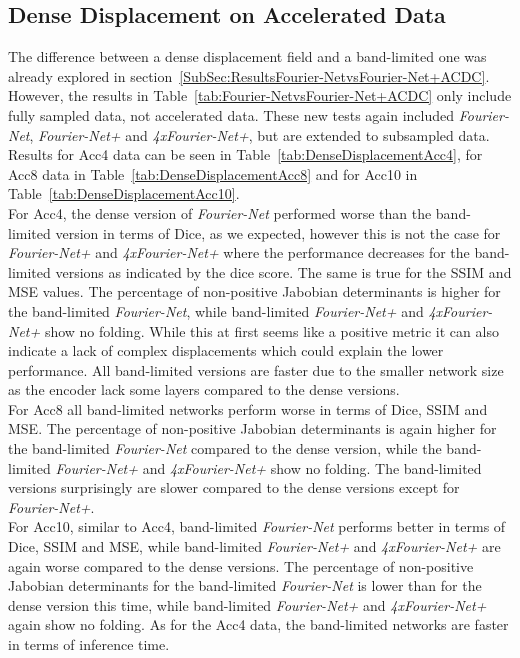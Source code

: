 \documentclass[english,version-2022-01]{uzl-thesis} %
\begin{document}
\subsection{Dense Displacement on Accelerated Data} \label{SubSec:DenseDisplacementAcc}
The difference between a dense displacement field and a band-limited one was already explored in section~\ref{SubSec:ResultsFourier-NetvsFourier-Net+ACDC}. However, the results in Table~\ref{tab:Fourier-NetvsFourier-Net+ACDC} only include fully sampled data, not accelerated data. These new tests again included \emph{Fourier-Net}, \emph{Fourier-Net+} and \emph{4xFourier-Net+}, but are extended to subsampled data. Results for Acc4 data can be seen in Table~\ref{tab:DenseDisplacementAcc4}, for Acc8 data in Table~\ref{tab:DenseDisplacementAcc8} and for Acc10 in Table~\ref{tab:DenseDisplacementAcc10}. \\
For Acc4, the dense version of \emph{Fourier-Net} performed worse than the band-limited version in terms of Dice, as we expected, however this is not the case for \emph{Fourier-Net+} and \emph{4xFourier-Net+} where the performance decreases for the band-limited versions as indicated by the dice score. The same is true for the SSIM and MSE values. The percentage of non-positive Jabobian determinants is higher for the band-limited \emph{Fourier-Net}, while band-limited \emph{Fourier-Net+} and \emph{4xFourier-Net+} show no folding. While this at first seems like a positive metric it can also indicate a lack of complex displacements which could explain the lower performance. All band-limited versions are faster due to the smaller network size as the encoder lack some layers compared to the dense versions.\\
For Acc8 all band-limited networks perform worse in terms of Dice, SSIM and MSE. The percentage of non-positive Jabobian determinants is again higher for the band-limited \emph{Fourier-Net} compared to the dense version, while the band-limited \emph{Fourier-Net+} and \emph{4xFourier-Net+} show no folding. The band-limited versions surprisingly are slower compared to the dense versions except for \emph{Fourier-Net+}. \\
For Acc10, similar to Acc4, band-limited \emph{Fourier-Net} performs better in terms of Dice, SSIM and MSE, while band-limited \emph{Fourier-Net+} and \emph{4xFourier-Net+} are again worse compared to the dense versions. The percentage of non-positive Jabobian determinants for the band-limited \emph{Fourier-Net} is lower than for the dense version this time, while band-limited \emph{Fourier-Net+} and \emph{4xFourier-Net+} again show no folding. As for the Acc4 data, the band-limited networks are faster in terms of inference time.\\
\end{document}

